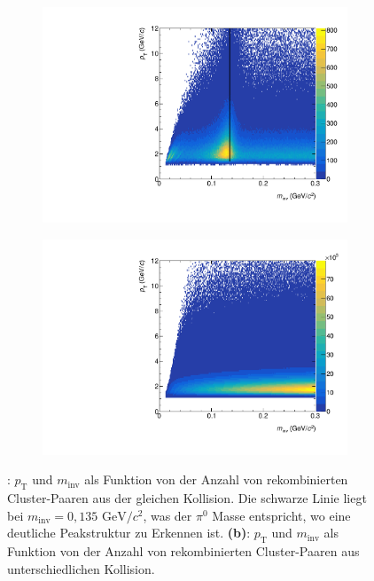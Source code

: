 \begin{figure}[tbp] \label{figInvMassPt}
\centering
\begin{subfigure}{.5\textwidth}
	\centering
	\includegraphics[width=.95\linewidth]{hInvMass_pT_Signal.pdf}
	\caption{}
	\label{figInvMassPt_a}
\end{subfigure}%
	\begin{subfigure}{.5\textwidth}
	\centering
	\includegraphics[width=.95\linewidth]{hInvMass_pT_Bkg.pdf}
	\caption{}
	\label{figInvMassPt_b}
\end{subfigure}
\caption{: $p_\text{T}$ und $m_\text{inv}$ als Funktion von der Anzahl von rekombinierten  Cluster-Paaren aus der gleichen Kollision.
Die schwarze Linie liegt bei $m_{\text{inv}}=0,135\text{ GeV/}c^{2}$, was der $\pi^{0}$ Masse entspricht, wo eine deutliche Peakstruktur zu Erkennen ist.
\newline
{\bf (b)}: $p_\text{T}$ und $m_\text{inv}$ als Funktion von der Anzahl von rekombinierten  Cluster-Paaren aus unterschiedlichen Kollision.}
\end{figure}
